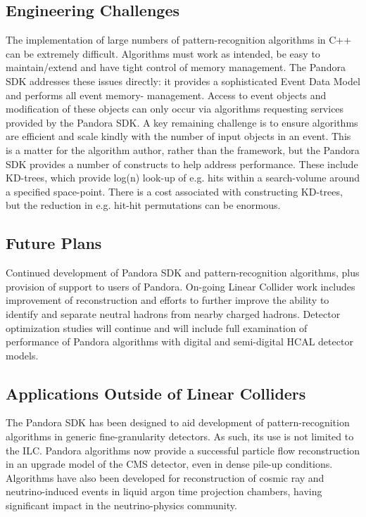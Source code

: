 \subsection{Engineering Challenges}
The implementation of large numbers of pattern-recognition algorithms in C++ can
be extremely difficult. Algorithms must work as intended, be easy to
maintain/extend and have tight control of memory management. The Pandora SDK
addresses these issues directly: it provides a sophisticated Event Data Model
and performs all event memory- management. Access to event objects and
modification of these objects can only occur via algorithms requesting services
provided by the Pandora SDK. A key remaining challenge is to ensure algorithms
are efficient and scale kindly with the number of input objects in an event.
This is a matter for the algorithm author, rather than the framework, but the
Pandora SDK provides a number of constructs to help address performance. These
include KD-trees, which provide log(n) look-up of e.g. hits within a
search-volume around a specified space-point. There is a cost associated with
constructing KD-trees, but the reduction in e.g. hit-hit permutations can be
enormous.

\subsection{Future Plans}
Continued development of Pandora SDK and pattern-recognition algorithms, plus
provision of support to users of Pandora. On-going Linear Collider work includes improvement
of \Ppizero reconstruction and efforts to further improve the ability to identify and
separate neutral hadrons from nearby charged hadrons. Detector optimization
studies will continue and will include full examination of performance of
Pandora algorithms with digital and semi-digital HCAL detector models.

\subsection{Applications Outside of Linear Colliders}
The Pandora SDK has been designed to aid development of pattern-recognition
algorithms in generic fine-granularity detectors. As such, its use is not
limited to the ILC. Pandora algorithms now provide a successful particle flow
reconstruction in an upgrade model of the CMS detector, even in dense pile-up
conditions. Algorithms have also been developed for reconstruction of cosmic ray
and neutrino-induced events in liquid argon time projection chambers, having
significant impact in the neutrino-physics community.

